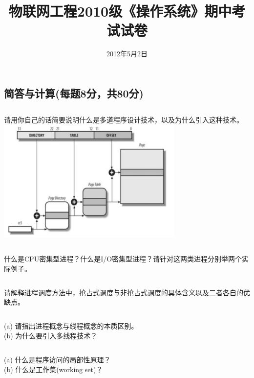 \documentclass[a4paper,11pt]{article}
\title{物联网工程2010级《操作系统》期中考试试卷}
\date{}
\date{2012年5月2日}
\begin{document}
\begin{CJK*}{UTF8}{gbsn}

\maketitle

\section{简答与计算(每题8分，共80分)}
\subsection{}
请用你自己的话简要说明什么是多道程序设计技术，以及为什么引入这种技术。
\includegraphics{hehe.png}
\\[1in]

\subsection{}
什么是CPU密集型进程？什么是I/O密集型进程？请针对这两类进程分别举两个实际例子。
\\[1in]

\subsection{}
请解释进程调度方法中，抢占式调度与非抢占式调度的具体含义以及二者各自的优缺点。
\\[1in]

\subsection{}
(a) 请指出进程概念与线程概念的本质区别。\\
(b) 为什么要引入多线程技术？
\\[1in]

\subsection{}
(a)  什么是程序访问的局部性原理？\\
(b)  什么是工作集(working set)？
\\[1in]


\end{CJK*}
\end{document}
